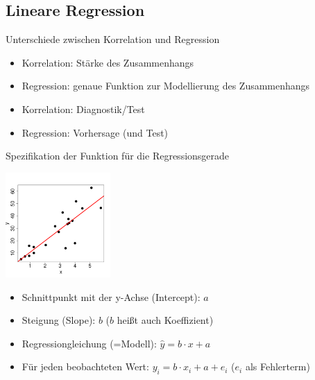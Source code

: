 \subsection{Lineare Regression}

\begin{frame}
  {Unterschiede zwischen Korrelation und Regression}
  \begin{itemize}[<+->]
    \item Korrelation: Stärke des Zusammenhangs
    \item \alert{Regression: genaue Funktion zur Modellierung des Zusammenhangs}
      \vspace{0.5cm}
    \item Korrelation: Diagnostik\slash Test
    \item \alert{Regression: Vorhersage} (und Test)
  \end{itemize}
\end{frame}

\begin{frame}
  {Spezifikation der Funktion für die Regressionsgerade}
  \vspace{-0.5cm}
  \begin{center}
    \includegraphics[width=0.3\textwidth]{graphics/regline}
  \end{center}
  \vspace{-0.5cm}
  \pause
  \begin{itemize}[<+->]
    \item Schnittpunkt mit der y-Achse (\alert{Intercept}): \alert{$a$}
    \item Steigung (\alert{Slope}): \alert{$b$} ($b$ heißt auch \alert{Koeffizient}) 
    \item \alert{Regressiongleichung (=Modell): $\hat{y}=b\cdot x+a$}
    \item Für jeden beobachteten Wert: \alert{$y_i=b\cdot x_i+a+e_i$} ($e_i$ als Fehlerterm)
  \end{itemize}
\end{frame}

